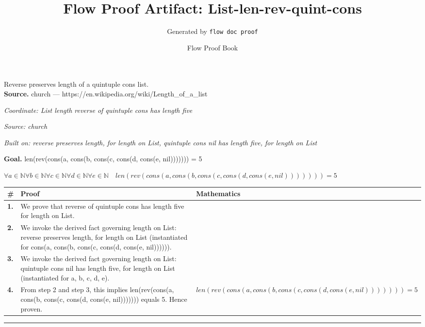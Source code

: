 \documentclass[11pt]{article}
\title{Flow Proof Artifact: List-len-rev-quint-cons}
\author{Generated by \texttt{flow doc proof}}
\date{Flow Proof Book}
\theoremstyle{definition}
\begin{document}
\maketitle
Reverse preserves length of a quintuple cons list.\\[0.5em]
\textbf{Source.} church — https://en.wikipedia.org/wiki/Length\_of\_a\_list\\[0.5em]
\bigskip
{}\par
\smallskip\noindent\textit{Coordinate: List \cdot length \cdot reverse of quintuple cons has length five}\par
\smallskip\noindent\textit{Source: church}\par
\smallskip\noindent\textit{Built on: reverse preserves length, for length on List, quintuple cons nil has length five, for length on List}\par
\medskip
\noindent\textbf{Goal.} len(rev(cons(a, cons(b, cons(c, cons(d, cons(e, nil))))))) = 5\par
\noindent$\displaystyle \forall a \in \mathbb{N} \forall b \in \mathbb{N} \forall c \in \mathbb{N} \forall d \in \mathbb{N} \forall e \in \mathbb{N}\quad len(rev(cons(a, cons(b, cons(c, cons(d, cons(e, nil))))))) = 5$\par
\medskip
\noindent
\begin{tabular}{@{} >{\raggedright\arraybackslash}p{} >{\raggedright\arraybackslash}p{} >{\raggedleft\arraybackslash}p{} @{}}
\textbf{\#} & \textbf{Proof} & \textbf{Mathematics} \\
\midrule
\textbf{1.} & We prove that reverse of quintuple cons has length five for length on List. & \\[0.45em]
\textbf{2.} & We invoke the derived fact governing length on List: reverse preserves length, for length on List (instantiated for cons(a, cons(b, cons(c, cons(d, cons(e, nil)))))). & \\[0.45em]
\textbf{3.} & We invoke the derived fact governing length on List: quintuple cons nil has length five, for length on List (instantiated for a, b, c, d, e). & \\[0.45em]
\textbf{4.} & From step 2 and step 3, this implies len(rev(cons(a, cons(b, cons(c, cons(d, cons(e, nil))))))) equals 5. Hence proven. & $\displaystyle len(rev(cons(a, cons(b, cons(c, cons(d, cons(e, nil))))))) = 5$ \\[0.45em]
\bottomrule
\end{tabular}
\label{thm:List-length-reverse_of_quintuple_cons_has_length_five}
\par\medskip\hrule
\end{document}

